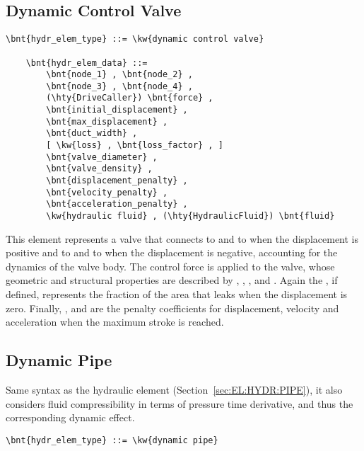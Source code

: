 \subsection{Dynamic Control Valve}
\label{sec:EL:HYDR:DYNAMIC_CONTROL_VALVE}
\begin{Verbatim}[commandchars=\\\{\}]
    \bnt{hydr_elem_type} ::= \kw{dynamic control valve}

    \bnt{hydr_elem_data} ::=
        \bnt{node_1} , \bnt{node_2} ,
        \bnt{node_3} , \bnt{node_4} ,
        (\hty{DriveCaller}) \bnt{force} ,
        \bnt{initial_displacement} ,
        \bnt{max_displacement} ,
        \bnt{duct_width} ,
        [ \kw{loss} , \bnt{loss_factor} , ]
        \bnt{valve_diameter} ,
        \bnt{valve_density} ,
        \bnt{displacement_penalty} ,
        \bnt{velocity_penalty} ,
        \bnt{acceleration_penalty} ,
        \kw{hydraulic fluid} , (\hty{HydraulicFluid}) \bnt{fluid}
\end{Verbatim}
This element represents a valve that connects
 to  and  to 
when the displacement is positive and  to 
and  to  when the displacement is negative,
accounting for the dynamics of the valve body.
The control force  is applied to the valve, whose 
geometric and structural properties are described by 
, ,
,  and .
Again the , if defined, represents the fraction
of the area that leaks when the displacement is zero.
Finally, ,  and 
are the penalty coefficients for displacement, velocity and acceleration
when the maximum stroke is reached.




\subsection{Dynamic Pipe}
\label{sec:EL:HYDR:DYNAMIC_PIPE}
Same syntax as the  hydraulic element
(Section~\ref{sec:EL:HYDR:PIPE}),
it also considers fluid compressibility in terms of pressure time derivative,
and thus the corresponding dynamic effect.
\begin{Verbatim}[commandchars=\\\{\}]
    \bnt{hydr_elem_type} ::= \kw{dynamic pipe}
\end{Verbatim}

